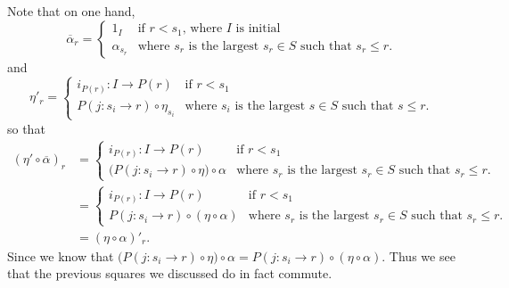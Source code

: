 Note that on one hand, 
\[
    \overline{\alpha}_r = 
    \begin{cases}
        1_I & \text{if } r < s_1  \text{, where } I \text{ is initial}\\
        \alpha_{s_r} & \text{where } s_r \text{ is the largest } s_r \in S \text{ such that } s_r \le r. 
    \end{cases}
\]
and 
\[
    \eta'_r
    = 
    \begin{cases}
        i_{P(r)}: I \to P(r) & \text{if } r < s_1\\
        P(j: s_i \to r) \circ \eta_{s_i} & \text{where } s_i \text{ is the largest } s \in S \text{ such that } s \le r. 
    \end{cases}
\]
so that 
\begin{align*}
    (\eta' \circ \overline{\alpha})_r
    &=     
    \begin{cases}
        i_{P(r)}: I \to P(r) & \text{if } r < s_1\\
        \big(P(j: s_i \to r ) \circ \eta \big)\circ\alpha & \text{where } s_r \text{ is the largest } s_r \in S \text{ such that } s_r \le r. 
    \end{cases}\\
    &=
    \begin{cases}
        i_{P(r)}: I \to P(r) & \text{if } r < s_1\\
        P(j: s_i \to r ) \circ (\eta \circ\alpha) & \text{where } s_r \text{ is the largest } s_r \in S \text{ such that } s_r \le r. 
    \end{cases}\\
    &=  
    (\eta \circ \alpha)'_r.
\end{align*}
Since we know that $\big(P(j: s_i \to r)\circ \eta \big)\circ\alpha 
= P(j: s_i \to r) \circ (\eta \circ \alpha)$. 
Thus we see that the previous squares we discussed do in fact commute. 


